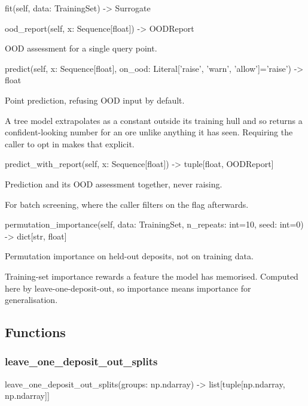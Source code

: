 \documentclass[10pt,a4paper,twoside]{report}
\begin{document}
\begin{verbatimsmall}
fit(self, data: TrainingSet) -> Surrogate
\end{verbatimsmall}

\begin{verbatimsmall}
ood_report(self, x: Sequence[float]) -> OODReport
\end{verbatimsmall}

OOD assessment for a single query point.

\begin{verbatimsmall}
predict(self, x: Sequence[float], on_ood: Literal['raise', 'warn', 'allow']='raise') -> float
\end{verbatimsmall}

Point prediction, refusing OOD input by default.

A tree model extrapolates as a constant outside its training hull and so returns a confident-looking number for an ore unlike anything it has seen. Requiring the caller to opt in makes that explicit.

\begin{verbatimsmall}
predict_with_report(self, x: Sequence[float]) -> tuple[float, OODReport]
\end{verbatimsmall}

Prediction and its OOD assessment together, never raising.

For batch screening, where the caller filters on the flag afterwards.

\begin{verbatimsmall}
permutation_importance(self, data: TrainingSet, n_repeats: int=10, seed: int=0) -> dict[str, float]
\end{verbatimsmall}

Permutation importance on held-out deposits, not on training data.

Training-set importance rewards a feature the model has memorised. Computed here by leave-one-deposit-out, so importance means importance for generalisation.

\subsection*{Functions}

\subsubsection*{leave\_one\_deposit\_out\_splits}

\begin{verbatimsmall}
leave_one_deposit_out_splits(groups: np.ndarray) -> list[tuple[np.ndarray, np.ndarray]]
\end{verbatimsmall}
\end{document}
